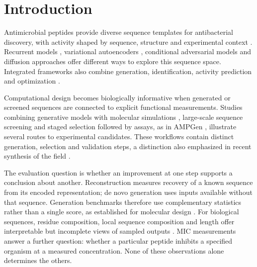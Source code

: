 \documentclass[unnumsec,webpdf,contemporary,large]{oup-authoring-template}
\begin{document}


\maketitle
\pagestyle{manuscript}
\raggedbottom

\section{Introduction}

Antimicrobial peptides provide diverse sequence templates for antibacterial discovery, with activity shaped by sequence, structure and experimental context \cite{ref50,ref51}. Recurrent models \cite{ref1}, variational autoencoders \cite{ref16,ref17,ref2}, conditional adversarial models \cite{ref15,ref19} and diffusion approaches \cite{ref9,ref11,ref20} offer different ways to explore this sequence space. Integrated frameworks also combine generation, identification, activity prediction and optimization \cite{ref21}.

Computational design becomes biologically informative when generated or screened sequences are connected to explicit functional measurements. Studies combining generative models with molecular simulations \cite{ref14,refCao2023}, large-scale sequence screening \cite{ref22} and staged selection followed by assays, as in AMPGen \cite{ref9}, illustrate several routes to experimental candidates. These workflows contain distinct generation, selection and validation steps, a distinction also emphasized in recent synthesis of the field \cite{ref25}.

The evaluation question is whether an improvement at one step supports a conclusion about another. Reconstruction measures recovery of a known sequence from its encoded representation; de novo generation uses inputs available without that sequence. Generation benchmarks therefore use complementary statistics rather than a single score, as established for molecular design \cite{ref26,ref28}. For biological sequences, residue composition, local sequence composition and length offer interpretable but incomplete views of sampled outputs \cite{ref29,ref8}. MIC measurements answer a further question: whether a particular peptide inhibits a specified organism at a measured concentration. None of these observations alone determines the others.
\end{document}
